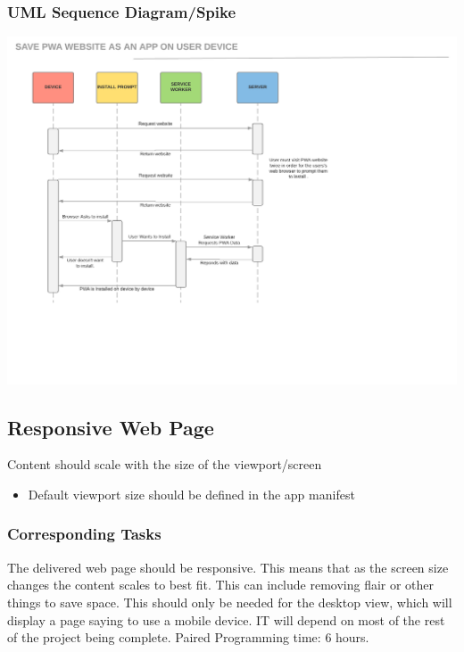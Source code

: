 \documentclass[12pt]{article}
\begin{document}
\subsubsection{UML Sequence Diagram/Spike}
\includegraphics[scale=0.5]{img/15.png}\linebreak

\subsection{Responsive Web Page}
Content should scale with the size of the viewport/screen
\begin{itemize}
  \item Default viewport size should be defined in the app manifest
\end{itemize}
\subsubsection{Corresponding Tasks}
	The delivered web page should be responsive.  This means that as the screen size changes the content scales to best fit.  This can include removing flair or other things to save space.  This should only be needed for the desktop view, which will display a page saying to use a mobile device.  IT will depend on most of the rest of the project being complete.  Paired Programming time: 6 hours.
\end{document}
